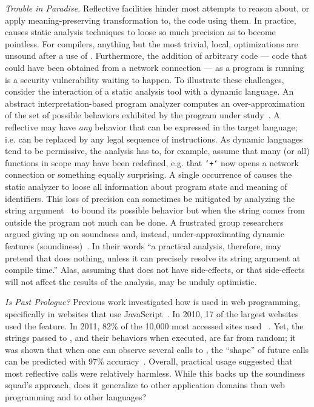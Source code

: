 \documentclass[review,screen,acmsmall,anonymous=true]{acmart}
\begin{document}
\vspace{2mm}\noindent\emph{Trouble in Paradise.} Reflective facilities
hinder most attempts to reason about, or apply meaning-preserving
transformation to, the code using them. In practice, \eval causes
static analysis techniques to loose so much precision as to become
pointless. For compilers, anything but the most trivial, local,
optimizations are unsound after a use of \eval. Furthermore, the
addition of arbitrary code --- code that could have been obtained from
a network connection --- as a program is running is a security
vulnerability waiting to happen. To illustrate these challenges,
consider the interaction of a static analysis tool with a dynamic
language. An abstract interpretation-based program analyzer computes
an over-approximation of the set of possible behaviors exhibited by
the program under study~\cite{cc77}. A reflective may have \emph{any}
behavior that can be expressed in the target language; i.e. \eval can
be replaced by any legal sequence of instructions. As dynamic
languages tend to be permissive, the analysis has to, for example,
assume that many (or all) functions in scope may have been redefined,
e.g. that \texttt{`+`} now opens a network connection or something
equally surprising. A single occurrence of \eval causes the static
analyzer to loose all information about program state and
meaning of identifiers. This loss of precision can sometimes be
mitigated by analyzing the string argument~\cite{moller03} to bound its
possible behavior but when the string comes from outside the program
not much can be done. A frustrated group researchers argued giving up
on soundness and, instead, under-approximating dynamic features
(soundiness)~\cite{soundy}. In their words ``a practical analysis,
therefore, may pretend that \eval does nothing, unless it can
precisely resolve its string argument at compile time.'' Alas,
assuming that \eval does not have side-effects, or that side-effects
will not affect the results of the analysis, may be unduly optimistic.

\vspace{2mm}\noindent\emph{Is Past Prologue?} Previous work investigated how
\eval is used in web programming, specifically in websites that use
JavaScript~\cite{pldi10a}. In 2010, 17 of the largest websites used the feature.
In 2011, 82\% of the 10,000 most accessed sites used \eval~\cite{ecoop11}. Yet,
the strings passed to \eval, and their behaviors when executed, are far from
random; it was shown that when one can observe several calls to \eval, the
``shape'' of future calls can be predicted with 97\% accuracy~\cite{oopsla12b}.
Overall, practical usage suggested that most reflective calls were relatively
harmless. While this backs up the soundiness squad's approach, does it
generalize to other application domains than web programming and to other
languages?
\end{document}
